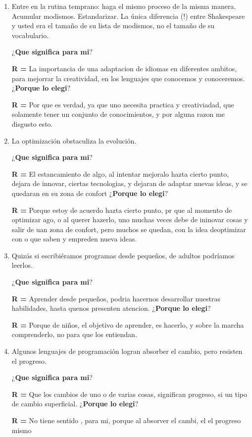 \documentclass[letterpaper,12pt]{article}
\begin{document}
\begin{enumerate}
\item Entre en la rutina temprano: haga el mismo proceso de la misma manera. Acumular modismos. Estandarizar. La única diferencia (!) entre Shakespeare y usted era el tamaño de su lista de modismos, no el tamaño de su vocabulario.\par
\textbf{$¿$Que significa para mi$?$}\par
\textbf{R =} \text La importancia de una adaptacion de idiomas en diferentes ambitos, para mejorrar la creatividad, en los lenguajes que conocemos y conoceremos.
\textbf{$¿$Porque lo elegi$?$}\par
\textbf{R =} \text Por que es verdad, ya que uno necesita practica y creativiadad, que solamente tener un conjunto de conocimientos, y por alguna razon me disgusto esto.

\item La optimización obstaculiza la evolución.\par
\textbf{$¿$Que significa para mi$?$}\par
\textbf{R =} \text El estancamiento de algo, al intentar mejoralo hazta cierto punto, dejara de innovar, ciertas tecnologias, y dejaran de adaptar nuevas ideas, y se quedaran en su zona de confort
\textbf{$¿$Porque lo elegi$?$}\par
\textbf{R =} \text Porque estoy de acuerdo hazta cierto punto, pr que al momento de optimizar ago, o al querer hazerlo, uno muchas veces debe de ininovar cosas y salir de uan zona de confort, pero muchos se quedan, con la idea deoptimizar con o que saben y empreden nueva ideas.

\item Quizás si escribiéramos programas desde pequeños, de adultos podríamos leerlos.\par
\textbf{$¿$Que significa para mi$?$}\par
\textbf{R =} \text Aprender desde pequeños, podria hacernos desarrollar nuestras habilidades, hasta quenos presenten atencion.
\textbf{$¿$Porque lo elegi$?$}\par
\textbf{R =} \text Porque de niños, el objetivo de aprender, es hacerlo, y sobre la marcha comprenderlo, no para que los entiendan.

\item Algunos lenguajes de programación logran absorber el cambio, pero resisten el progreso.\par
\textbf{$¿$Que significa para mi$?$}\par
\textbf{R =} \text Que los cambios de uno o de varias cosas, significan progreso, si un tipo de cambio superficial.
\textbf{$¿$Porque lo elegi$?$}\par
\textbf{R =} \text No tiene sentido , para mi, porque al absorver el cambi, el el progreso mismo


\end{enumerate}
\end{document}
